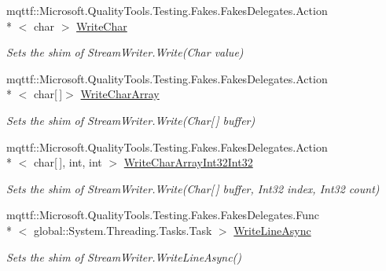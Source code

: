 \begin{DoxyCompactItemize}
mqttf\-::\-Microsoft.\-Quality\-Tools.\-Testing.\-Fakes.\-Fakes\-Delegates.\-Action\\*
$<$ char $>$ \hyperlink{class_system_1_1_i_o_1_1_fakes_1_1_shim_stream_writer_a9caf8412e8826453e1b286dce20da723}{Write\-Char}
\begin{DoxyCompactList}\small\item\em Sets the shim of Stream\-Writer.\-Write(\-Char value)\end{DoxyCompactList}\item 
mqttf\-::\-Microsoft.\-Quality\-Tools.\-Testing.\-Fakes.\-Fakes\-Delegates.\-Action\\*
$<$ char\mbox{[}$\,$\mbox{]}$>$ \hyperlink{class_system_1_1_i_o_1_1_fakes_1_1_shim_stream_writer_a63d89c0c6e0b747d06bb2c35239e118e}{Write\-Char\-Array}
\begin{DoxyCompactList}\small\item\em Sets the shim of Stream\-Writer.\-Write(\-Char\mbox{[}$\,$\mbox{]} buffer)\end{DoxyCompactList}\item 
mqttf\-::\-Microsoft.\-Quality\-Tools.\-Testing.\-Fakes.\-Fakes\-Delegates.\-Action\\*
$<$ char\mbox{[}$\,$\mbox{]}, int, int $>$ \hyperlink{class_system_1_1_i_o_1_1_fakes_1_1_shim_stream_writer_a7a39b0401644e1cc5d5dabb52a8afeee}{Write\-Char\-Array\-Int32\-Int32}
\begin{DoxyCompactList}\small\item\em Sets the shim of Stream\-Writer.\-Write(\-Char\mbox{[}$\,$\mbox{]} buffer, Int32 index, Int32 count)\end{DoxyCompactList}\item 
mqttf\-::\-Microsoft.\-Quality\-Tools.\-Testing.\-Fakes.\-Fakes\-Delegates.\-Func\\*
$<$ global\-::\-System.\-Threading.\-Tasks.\-Task $>$ \hyperlink{class_system_1_1_i_o_1_1_fakes_1_1_shim_stream_writer_a63c3317a67aa741c58087ce1da7ba65e}{Write\-Line\-Async}
\begin{DoxyCompactList}\small\item\em Sets the shim of Stream\-Writer.\-Write\-Line\-Async()\end{DoxyCompactList}\item 

\end{DoxyCompactItemize}
